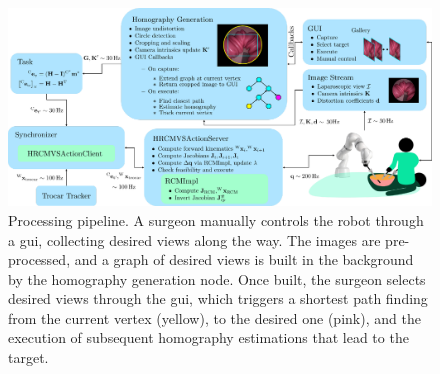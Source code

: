 \begin{figure}[tb]
\centering
\includegraphics[width=\textwidth]{img/h_rcm_vs_pipeline_real_view.pdf}
\caption{Processing pipeline. A surgeon manually controls the robot through a \gls{gui}, collecting desired views along the way. The images are pre-processed, and a graph of desired views is built in the background by the homography generation node. Once built, the surgeon selects desired views through the \gls{gui}, which triggers a shortest path finding from the current vertex (yellow), to the desired one (pink), and the execution of subsequent homography estimations that lead to the target.}
\label{c2:fig:pipe}
\end{figure}

